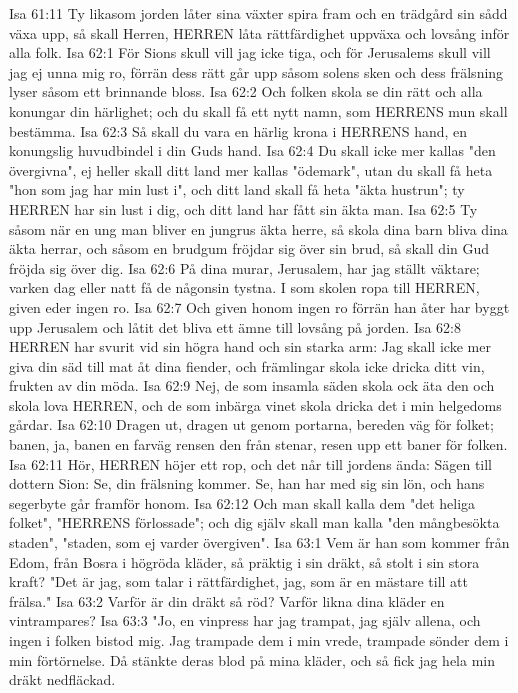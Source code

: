 Isa 61:11  Ty likasom jorden låter sina växter spira fram och en trädgård sin sådd växa upp, så skall Herren, HERREN låta rättfärdighet uppväxa och lovsång inför alla folk.
Isa 62:1  För Sions skull vill jag icke tiga, och för Jerusalems skull vill jag ej unna mig ro, förrän dess rätt går upp såsom solens sken och dess frälsning lyser såsom ett brinnande bloss.
Isa 62:2  Och folken skola se din rätt och alla konungar din härlighet; och du skall få ett nytt namn, som HERRENS mun skall bestämma.
Isa 62:3  Så skall du vara en härlig krona i HERRENS hand, en konungslig huvudbindel i din Guds hand.
Isa 62:4  Du skall icke mer kallas "den övergivna", ej heller skall ditt land mer kallas "ödemark", utan du skall få heta "hon som jag har min lust i", och ditt land skall få heta "äkta hustrun"; ty HERREN har sin lust i dig, och ditt land har fått sin äkta man.
Isa 62:5  Ty såsom när en ung man bliver en jungrus äkta herre, så skola dina barn bliva dina äkta herrar, och såsom en brudgum fröjdar sig över sin brud, så skall din Gud fröjda sig över dig.
Isa 62:6  På dina murar, Jerusalem, har jag ställt väktare; varken dag eller natt få de någonsin tystna. I som skolen ropa till HERREN, given eder ingen ro.
Isa 62:7  Och given honom ingen ro förrän han åter har byggt upp Jerusalem och låtit det bliva ett ämne till lovsång på jorden.
Isa 62:8  HERREN har svurit vid sin högra hand och sin starka arm: Jag skall icke mer giva din säd till mat åt dina fiender, och främlingar skola icke dricka ditt vin, frukten av din möda.
Isa 62:9  Nej, de som insamla säden skola ock äta den och skola lova HERREN, och de som inbärga vinet skola dricka det i min helgedoms gårdar.
Isa 62:10  Dragen ut, dragen ut genom portarna, bereden väg för folket; banen, ja, banen en farväg rensen den från stenar, resen upp ett baner för folken.
Isa 62:11  Hör, HERREN höjer ett rop, och det når till jordens ända: Sägen till dottern Sion: Se, din frälsning kommer. Se, han har med sig sin lön, och hans segerbyte går framför honom.
Isa 62:12  Och man skall kalla dem "det heliga folket", "HERRENS förlossade"; och dig själv skall man kalla "den mångbesökta staden", "staden, som ej varder övergiven".
Isa 63:1  Vem är han som kommer från Edom, från Bosra i högröda kläder, så präktig i sin dräkt, så stolt i sin stora kraft? "Det är jag, som talar i rättfärdighet, jag, som är en mästare till att frälsa."
Isa 63:2  Varför är din dräkt så röd? Varför likna dina kläder en vintrampares?
Isa 63:3  "Jo, en vinpress har jag trampat, jag själv allena, och ingen i folken bistod mig. Jag trampade dem i min vrede, trampade sönder dem i min förtörnelse. Då stänkte deras blod på mina kläder, och så fick jag hela min dräkt nedfläckad.
